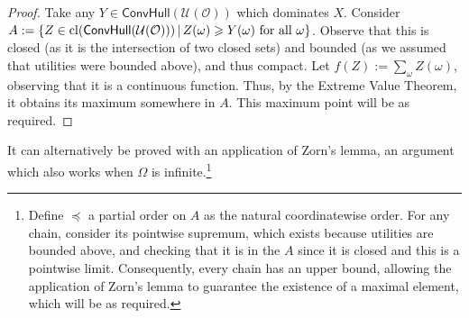 \documentclass[a4paper]{article}
\newcommand\cl{\mathrm{cl}}
\renewcommand\O{\mathcal{O}}
\newcommand\Uwald{\mathcal{U}} %
\newcommand{\Conv}{\mathsf{ConvHull}}
\newcommand\SetDelimiter[1][]{
	\nonscript\,#1\vert \allowbreak \nonscript\,\mathopen{}}
\providecommand\given{\SetDelimiter}
\renewcommand{\geq}{\geqslant}
\newenvironment{CCM rewritten}
{\begingroup\color{blue}} %
{\endgroup}              %
\begin{document}
	
	\begin{proof}
		Take any $Y\in \Conv(\Uwald(\O))$ which dominates $X$. Consider $A:=\{Z\in \cl(\Conv(\Uwald(\O)))\given  Z(\omega)\geq Y(\omega)\text{ for all $\omega$}\}$. Observe that this is closed (as it is the intersection of two closed sets) and bounded (as we assumed that utilities were bounded above), and thus compact. Let $f(Z):=\sum_\omega Z(\omega)$, observing that it is a continuous function. Thus, by the Extreme Value Theorem, it obtains its maximum somewhere in $A$. This maximum point will be as required. 
	\end{proof}
	
	It can alternatively be proved with an application of Zorn's lemma, an argument which also works when $\Omega$ is infinite.\footnote{Define $\preccurlyeq$ a partial order on $A$ as the natural coordinatewise order. For any chain, consider its pointwise supremum, which exists because utilities are bounded above, and checking that it is in the $A$ since it is closed and this is a pointwise limit. Consequently, every chain has an upper bound, allowing the application of Zorn's lemma to guarantee the existence of a maximal element, which will be as required. } 
	
\end{document}

